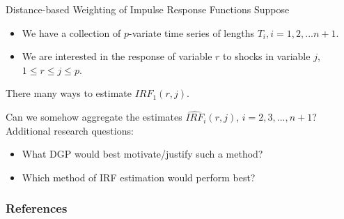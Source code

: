 \documentclass[9pt]{beamer}
\theoremstyle{definition}
\begin{document}
\begin{frame}{Distance-based Weighting of Impulse Response Functions}
    Suppose 
    \begin{itemize}
        \item We have a collection of $p$-variate time series of lengths $T_{i}, i=1,2,...n+1$.
        \item We are interested in the response of variable $r$ to shocks in variable $j$, $1\leq r \leq j \leq p$. 

    \end{itemize}
    
\bigbreak
There many ways to estimate $IRF_{1}(r,j).$

\bigbreak
Can we somehow aggregate the estimates $\widehat{IRF}_{i}(r,j)$, $i = 2,3,...,n+1$? \\

Additional research questions:
\begin{itemize}
    \item What DGP would best motivate/justify such a method?
    \item Which method of IRF estimation would perform best?

\end{itemize}
\end{frame}



    

\begin{frame}[t,allowframebreaks]
    \frametitle{References}

\printbibliography[heading=none]
\end{frame}
\end{document}
